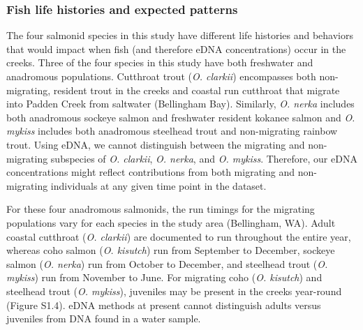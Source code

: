 \documentclass[
]{article}
\begin{document}
\hypertarget{fish-life-histories-and-expected-patterns}{%
\subsubsection{Fish life histories and expected
patterns}\label{fish-life-histories-and-expected-patterns}}

The four salmonid species in this study have different life histories
and behaviors that would impact when fish (and therefore eDNA
concentrations) occur in the creeks. Three of the four species in this
study have both freshwater and anadromous populations. Cutthroat trout
(\emph{O. clarkii}) encompasses both non-migrating, resident trout in
the creeks and coastal run cutthroat that migrate into Padden Creek from
saltwater (Bellingham Bay). Similarly, \emph{O. nerka} includes both
anadromous sockeye salmon and freshwater resident kokanee salmon and
\emph{O. mykiss} includes both anadromous steelhead trout and
non-migrating rainbow trout. Using eDNA, we cannot distinguish between
the migrating and non-migrating subspecies of \emph{O. clarkii},
\emph{O. nerka}, and \emph{O. mykiss}. Therefore, our eDNA
concentrations might reflect contributions from both migrating and
non-migrating individuals at any given time point in the dataset.

For these four anadromous salmonids, the run timings for the migrating
populations vary for each species in the study area (Bellingham, WA).
Adult coastal cutthroat (\emph{O. clarkii}) are documented to run
throughout the entire year, whereas coho salmon (\emph{O. kisutch}) run
from September to December, sockeye salmon (\emph{O. nerka}) run from
October to December, and steelhead trout (\emph{O. mykiss}) run from
November to June. For migrating coho (\emph{O. kisutch}) and steelhead
trout (\emph{O. mykiss}), juveniles may be present in the creeks
year-round (Figure S1.4). eDNA methods at present cannot distinguish
adults versus juveniles from DNA found in a water sample.
\end{document}
